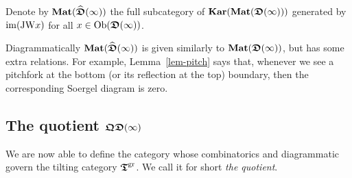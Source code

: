 \begin{defn}\label{defn-matdia}
Denote by $\Mat(\Dk)$ the full subcategory 
of $\Kar(\Mat(\D))$ generated by $\mathrm{im}(\JWx)$ for all $x\in\Ob(\D)$.
\end{defn}
Diagrammatically $\Mat(\Dk)$ is given similarly to 
$\Mat(\D)$, but has some extra relations. For example, 
Lemma~\ref{lem-pitch} says that, whenever we see a
pitchfork at the bottom (or its reflection at the top) 
boundary, then the corresponding Soergel diagram is zero.




\subsection{The quotient \texorpdfstring{$\QD$}{QDinfty}}\label{sub-qd}



We are now able to define the category 
whose combinatorics and diagrammatic 
govern the tilting category $\Tgr$. 
We call it for short \textit{the quotient}.



